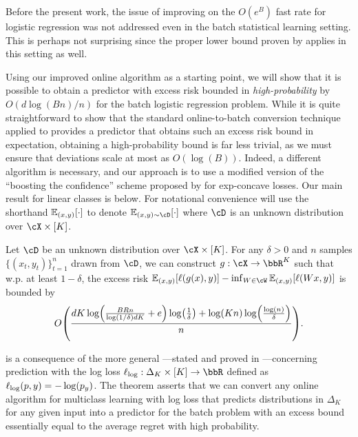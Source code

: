 
Before the present work, the issue of improving on the $O(e^{B})$ fast rate for logistic regression was not addressed even in the batch statistical learning setting. This is perhaps not surprising since the proper lower bound proven by \cite{hazan2014logistic} applies in this setting as well.

Using our improved online algorithm as a starting point, we will show that it is possible to obtain a predictor with excess risk bounded in \emph{high-probability} by $O(d\log(Bn)/n)$ for the batch logistic regression problem. While it is quite straightforward to show that the standard online-to-batch conversion technique applied to  provides a predictor that obtains such an excess risk bound in expectation, obtaining a high-probability bound is far less trivial, as we must ensure that deviations scale at most as $O(\log(B))$. Indeed, a different algorithm is necessary, and our approach is to use a modified version of the ``boosting the confidence'' scheme proposed by \cite{mehta2016fast} for exp-concave losses. Our main result for linear classes is  below. For notational convenience will use the shorthand $\operatorname*{\mathbb{E}}_{(x, y)}[\cdot]$ to denote $\En_{(x, y) \sim \cD}[\cdot]$ where $\cD$ is an unknown distribution over $\cX \times [K]$.

\begin{theorem}
\label{thm:high_prob_logn}
Let $\cD$ be an unknown distribution over $\cX \times [K]$. For any $\delta > 0$ and $n$ samples $\{(x_t, y_t)\}_{t=1}^n$ drawn from $\cD$, we can construct  $g: \cX \rightarrow \bbR^{K}$ such that w.p. at least $1-\delta$, the excess risk $\En_{(x, y)}[\ls(g(x), y)]-\inf_{W\in\cW} \En_{(x, y)}\brk*{\ls(Wx, y)}$ is bounded by
\begin{align*}
O\prn*{\frac{dK\log\prn*{\frac{BRn}{\log(1/\delta)dK} + e}\log\prn*{\frac{1}{\delta}} + \log(Kn)\log\prn*{\frac{\log(n)}{\delta}}}{n}}.
\end{align*}
\end{theorem}
 is a consequence of the more general ---stated and proved in ---concerning prediction with the log loss $\ls_\text{log}: \Delta_K \times [K] \rightarrow \R$ defined as $\ell_\text{log}(p, y) = -\log(p_y)$. The theorem asserts that we can convert any online algorithm for multiclass learning with log loss that predicts distributions in $\Delta_K$ for any given input into a predictor for the batch problem with an excess bound essentially equal to the average regret with high probability.



